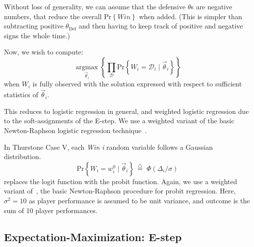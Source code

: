 \documentclass[10pt,twocolumn]{article}
\newcommand{\argmax}[2]{\ensuremath{   \underset{#1}{\operatorname{argmax}} \left\{ #2 \right\}  }}
\newcommand{\prb}[1]{\ensuremath{  \mathrm{Pr}\left\{ #1 \right\}  }}
\newcommand{\tridefeq}{\ensuremath{  \,{\overset{\triangle}{=}}\;   }}
\begin{document}
Without loss of generality, we can assume that the defensive $\theta$s are negative numbers, that reduce the overall $\prb{Win}$ when added.
(This is simpler than subtracting positive $\theta_{\mathrm{Def}}$ and then having to keep track of positive and negative signs the whole time.)

Now, we wish to compute:
\[
\argmax{\vec \theta_i}{ \prod_{\mathcal{D}} \prb{W_i = \mathcal{D}_i \mid \vec \theta_i}  }
\]%
when $W_i$ is fully observed with the solution expressed with respect to sufficient statistics of $\vec \theta_i$.

This reduces to logistic regression in general, and weighted logistic regression due to the soft-assignments of the E-step.
We use a weighted variant of the basic Newton-Raphson logistic regression technique~\cite{statPsuJialiStat597eNotes2Logit}.


In Thurstone Case V, each \emph{Win i} random variable follows a Gaussian distribution.
\[
\prb{W_i = w_i^0 \mid \vec \theta_i} \tridefeq \Phi\left( \Delta_i / \sigma \right)
\]%
replaces the logit function with the probit function.
Again, we use a weighted variant of~\cite{demidenko2001computational}, the basic Newton-Raphson procedure for probit regression.
Here, $\sigma^2 = 10$ as player performance is assumed to be unit variance, and outcome is the sum of 10 player performances.

\subsection{Expectation-Maximization: E-step}
\end{document}
